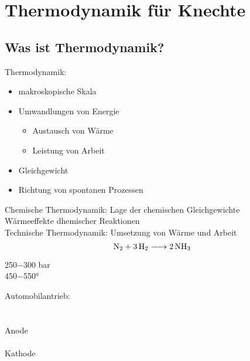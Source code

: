 \documentclass[a4paper, fleqn]{article}
\begin{document}
\tableofcontents
\newpage
\section{Thermodynamik für Knechte}
\subsection{Was ist Thermodynamik?}
Thermodynamik:
\begin{itemize}
    \item makroskopische Skala
    \item Umwandlungen von Energie
    \begin{itemize}
        \item Austausch von Wärme
        \item Leistung von Arbeit
    \end{itemize}
    \item Gleichgewicht
    \item Richtung von spontanen Prozessen
\end{itemize}
Chemische Thermodynamik: Lage der chemischen Gleichgewichte\\
\hspace*{1cm} Wärmeeffekte dhemischer Reaktionen\\
Technische Thermodynamik: Umsetzung von Wärme und Arbeit\\
\begin{equation*}
    \ce{N2 + 3H2 -> 2NH3}    
\end{equation*}
\begin{center}
    250$-$300 bar\\
    450$-$550°
\end{center}
 Automobilantrieb:\\
\\
\\
Anode\\
\hspace*{1cm} \\
Kathode\\
\hspace*{1cm} \\
\end{document}
